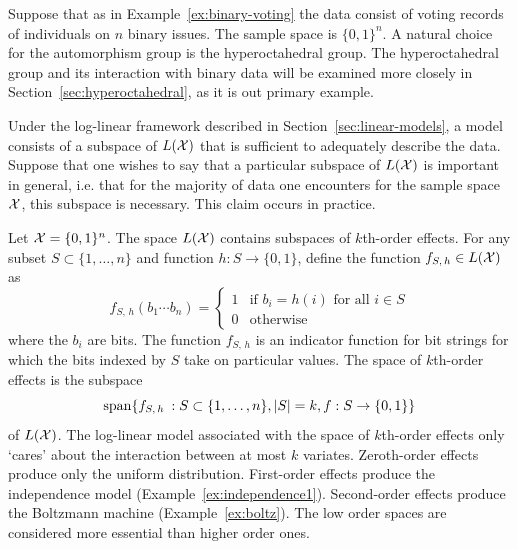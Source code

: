 \documentclass[cclicense]{hmcthesis}
\numberwithin{equation}{chapter}
\numberwithin{ucounter}{chapter}
\begin{document}
    \begin{example}
        Suppose that as in Example~\ref{ex:binary-voting} the data consist of
        voting records of individuals on $n$ binary issues.  The sample space is
        $\{0, 1\}^n$.  A natural choice for the automorphism group is the
        hyperoctahedral group.  The hyperoctahedral group and its interaction
        with binary data will be examined more closely in
        Section~\ref{sec:hyperoctahedral}, as it is out primary example.
    \end{example}
    
    Under the log-linear framework described in Section~\ref{sec:linear-models},
    a model consists of a subspace of $L(\mathcal{X})$ that is sufficient to adequately
    describe the data.  Suppose that one wishes to say that a particular
    subspace of $L(\mathcal{X})$ is important in general, i.e. that for the majority of
    data one encounters for the sample space $\mathcal{X}$, this subspace is necessary.
    This claim occurs in practice.

    \begin{example}
        Let $\mathcal{X} = \{0, 1\}^n$.  The space $L(\mathcal{X})$ contains subspaces of
        $k$th-order effects.  For any subset $S \subset \{1, \ldots, n\}$ and
        function $h: S \to \{0, 1\}$, define the function $f_{S,\,h} \in L(\mathcal{X})$
        as
        \[
            f_{S,\,h} (b_1 \cdots b_n) = \begin{cases}
                1 & \text{if $b_i = h(i)$ for all $i \in S$} \\
                0 & \text{otherwise}
            \end{cases}
        \]
        where the $b_i$ are bits.  The function $f_{S,\,h}$ is an indicator
        function for bit strings for which the bits indexed by $S$ take on
        particular values.  The space of $k$th-order effects is the subspace
        \[
            \spanset{f_{S,\,h} \STB S \subset \{1, \ldots, n\}, |S| = 
            k, f : S \to \{0, 1\}}
        \]
        of $L(\mathcal{X})$.
        The log-linear model associated with the space of $k$th-order effects
        only `cares' about the interaction between at most $k$ variates.
        Zeroth-order effects produce only the uniform distribution.  First-order
        effects produce the independence model (Example~\ref{ex:independence1}).
        Second-order effects produce the Boltzmann machine
        (Example~\ref{ex:boltz}).  The low order spaces are considered more
        essential than higher order ones.
    \end{example}
\end{document}
